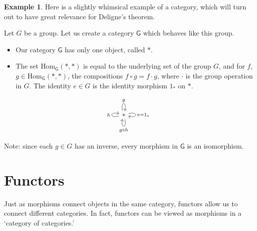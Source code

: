 \documentclass[a4paper,10pt]{scrreprt}
\newcommand{\Hom}{\mathrm{Hom}}
\theoremstyle{definition}
\newtheorem{example}{Example}[section]
\theoremstyle{plain}
\theoremstyle{remark}
\begin{document}
\begin{example}
  \label{eg:groupsaregroupoidswithoneobject}
  Here is a slightly whimsical example of a category, which will turn out to have great relevance for Deligne's theorem.

  Let $G$ be a group. Let us create a category $\mathsf{G}$ which behaves like this group.
  \begin{itemize}
    \item Our category $\mathsf{G}$ has only one object, called $*$.

    \item The set $\Hom_{\mathsf{G}}(*, *)$ is equal to the underlying set of the group $G$, and for $f$, $g \in \Hom_{\mathsf{G}}(*, *)$, the compositions $f \circ g = f\cdot g$, where $\cdot$ is the group operation in $G$. The identity $e \in G$ is the identity morphism $1_{*}$ on $*$.
  \end{itemize}
  \begin{equation*}
    \begin{tikzcd}
      *
      \arrow[loop right, "e = 1_{*}"]
      \arrow[loop above, "g"]
      \arrow[loop left, "h"]
      \arrow[loop below, "g \circ h"]
    \end{tikzcd}
  \end{equation*}

  Note: since each $g \in G$ has an inverse, every morphism in $\mathsf{G}$ is an isomorphism.
\end{example}

\section{Functors} \label{sec:functors}
Just as morphisms connect objects in the same category, functors allow us to connect different categories. In fact, functors can be viewed as morphisms in a `category of categories.'
\end{document}
